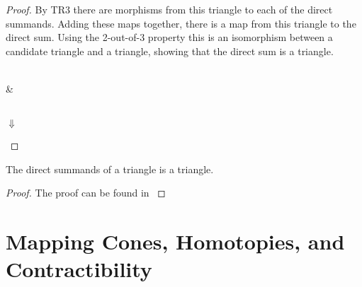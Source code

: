\begin{proof}
        By TR3 there are morphisms from this triangle to each of the direct summands. Adding these maps together, there is a map from this triangle to the direct sum. Using the 2-out-of-3 property this is an isomorphism between a candidate triangle and a triangle, showing that the direct sum is a triangle.
        \begin{center}
             \\
            \& \\
             \\
            $\Downarrow$ \\
        \end{center}
    \end{proof}

    \begin{lemma}
        The direct summands of a triangle is a triangle.
    \end{lemma}

    \begin{proof}
        The proof can be found in \cite{neeman}
    \end{proof}
    

\section{Mapping Cones, Homotopies, and Contractibility}

